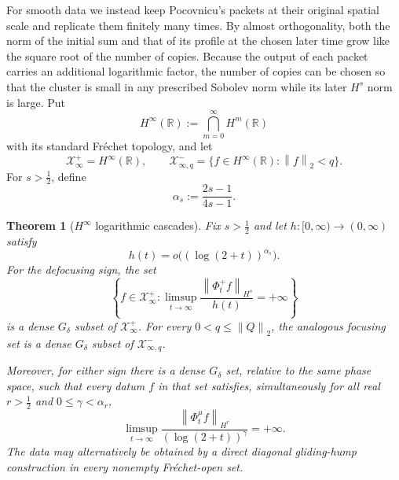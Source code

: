 \documentclass[11pt,reqno]{amsart}
\numberwithin{equation}{section}
\newtheorem{theorem}{Theorem}[section]
\theoremstyle{remark}
\newcommand{\R}{\mathbb R}
\newcommand{\X}{\mathcal X}
\newcommand{\half}{\frac12}
\newcommand{\norm}[1]{\left\lVert #1\right\rVert}
\newcommand{\flow}[1]{\Phi^{#1}}
\begin{document}
For smooth data we instead keep Pocovnicu's packets at their original spatial
scale and replicate them finitely many times.  By almost orthogonality, both
the norm of the initial sum and that of its profile at the chosen later time
grow like the square root of the number of copies.  Because the output of each
packet carries an additional logarithmic factor, the number of copies can be
chosen so that the cluster is small in any prescribed Sobolev norm while its
later $H^s$ norm is large.  Put
\begin{equation}\label{eq:hinfty}
 H^\infty(\R):=\bigcap_{m=0}^\infty H^m(\R)
\end{equation}
with its standard Fr\'echet topology, and let
\begin{equation}\label{eq:hinfty-spaces}
 \X^+_\infty=H^\infty(\R),
 \qquad
 \X^-_{\infty,q}=\{f\in H^\infty(\R):\norm f_2<q\}.
\end{equation}
For $s>\half$, define
\begin{equation}\label{eq:alpha}
 \alpha_s:=\frac{2s-1}{4s-1}.
\end{equation}

\begin{theorem}[$H^\infty$ logarithmic cascades]\label{thm:hinfty}
Fix $s>\half$ and let
$h:[0,\infty)\to(0,\infty)$ satisfy
\begin{equation}\label{eq:gauge}
 h(t)=o\bigl((\log(2+t))^{\alpha_s}\bigr).
\end{equation}
For the defocusing sign, the set
\begin{equation}\label{eq:hinfty-fixed}
 \left\{f\in\X^+_\infty:
 \limsup_{t\to\infty}
 \frac{\norm{\flow+_tf}_{H^s}}{h(t)}=+\infty\right\}
\end{equation}
is a dense $G_\delta$ subset of $\X^+_\infty$.  For every
$0<q\leq\norm Q_2$, the analogous focusing set is a dense $G_\delta$ subset
of $\X^-_{\infty,q}$.

Moreover, for either sign there is a dense $G_\delta$ set, relative to the
same phase space, such that every datum $f$ in that set satisfies,
simultaneously for all real $r>\half$ and $0\leq\gamma<\alpha_r$,
\begin{equation}\label{eq:simultaneous}
 \limsup_{t\to\infty}
 \frac{\norm{\flow\mu_tf}_{H^r}}
 { (\log(2+t))^\gamma}=+\infty.
\end{equation}
The data may alternatively be obtained by a direct diagonal gliding-hump
construction in every nonempty Fr\'echet-open set.
\end{theorem}
\end{document}
